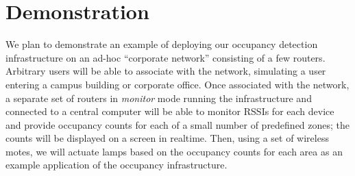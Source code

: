 \section{Demonstration}
We plan to demonstrate an example of deploying our occupancy detection infrastructure on an ad-hoc ``corporate network'' consisting of a few routers. Arbitrary users will be able to associate with the network, simulating a user entering a campus building or corporate office. Once associated with the network, a separate set of routers in \emph{monitor} mode running the infrastructure and connected to a central computer will be able to monitor RSSIs for each device and provide occupancy counts for each of a small number of predefined zones; the counts will be displayed on a screen in realtime. Then, using a set of wireless motes, we will actuate lamps based on the occupancy counts for each area as an example application of the occupancy infrastructure.